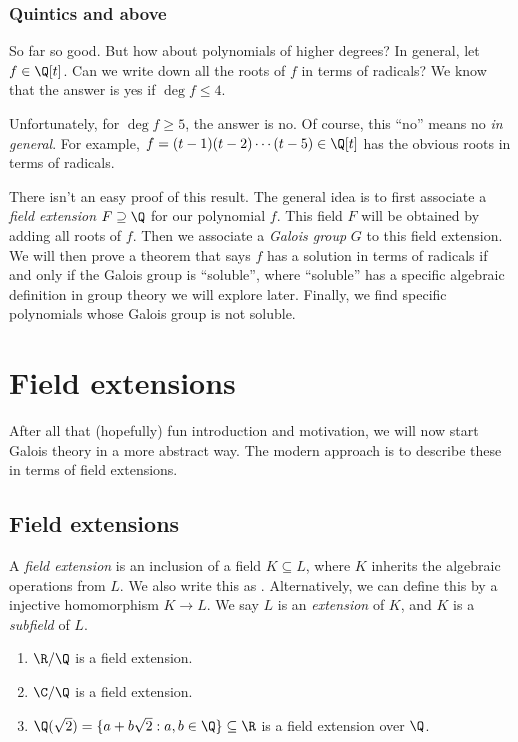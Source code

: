\documentclass[a4paper]{article}
\begin{document}
\subsubsection*{Quintics and above}
So far so good. But how about polynomials of higher degrees? In general, let $f \in \Q[t]$. Can we write down all the roots of $f$ in terms of radicals? We know that the answer is yes if $\deg f \leq 4$.

Unfortunately, for $\deg f \geq 5$, the answer is no. Of course, this ``no'' means no \emph{in general}. For example, $f = (t - 1)(t - 2) \cdots (t - 5)\in \Q[t]$ has the obvious roots in terms of radicals.

There isn't an easy proof of this result. The general idea is to first associate a \emph{field extension} $F \supseteq \Q$ for our polynomial $f$. This field $F$ will be obtained by adding all roots of $f$. Then we associate a \emph{Galois group} $G$ to this field extension. We will then prove a theorem that says $f$ has a solution in terms of radicals if and only if the Galois group is ``soluble'', where ``soluble'' has a specific algebraic definition in group theory we will explore later. Finally, we find specific polynomials whose Galois group is not soluble.

\section{Field extensions}
After all that (hopefully) fun introduction and motivation, we will now start Galois theory in a more abstract way. The modern approach is to describe these in terms of field extensions.

\subsection{Field extensions}
\begin{defi}
  A \emph{field extension} is an inclusion of a field $K\subseteq L$, where $K$ inherits the algebraic operations from $L$. We also write this as . Alternatively, we can define this by a injective homomorphism $K\to L$. We say $L$ is an \emph{extension} of $K$, and $K$ is a \emph{subfield} of $L$.
\end{defi}

\begin{eg}\leavevmode
  \begin{enumerate}
    \item $\R/\Q$ is a field extension.
    \item $\C/\Q$ is a field extension.
    \item $\Q(\sqrt{2}) = \{a + b\sqrt{2}: a, b\in \Q\} \subseteq \R$ is a field extension over $\Q$.
  \end{enumerate}
\end{eg}
\end{document}
